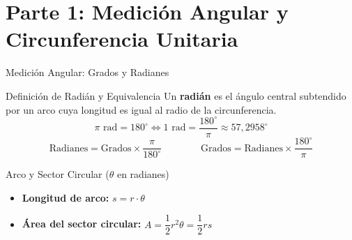 \documentclass[aspectratio=169]{beamer}
\begin{document}
\begin{frame}[plain]
  \titlepage
\end{frame}

\section{Parte 1: Medición Angular y Circunferencia Unitaria}


\begin{frame}{Medición Angular: Grados y Radianes}
  \begin{block}{Definición de Radián y Equivalencia}
    Un \textbf{radián} es el ángulo central subtendido por un arco cuya longitud es igual al radio de la circunferencia.
    $$\pi \text{ rad} = 180^\circ \iff 1 \text{ rad} = \frac{180^\circ}{\pi} \approx 57{,}2958^\circ$$
    $$\text{Radianes} = \text{Grados} \times \frac{\pi}{180^\circ} \qquad\qquad \text{Grados} = \text{Radianes} \times \frac{180^\circ}{\pi}$$
  \end{block}

  \vspace{4pt}
  \begin{block}{Arco y Sector Circular ($\theta$ en radianes)}
    \begin{itemize}
      \item \textbf{Longitud de arco:} $s = r \cdot \theta$
      \item \textbf{Área del sector circular:} $A = \dfrac{1}{2} r^2 \theta = \dfrac{1}{2} r s$
    \end{itemize}
  \end{block}
\end{frame}
\end{document}
